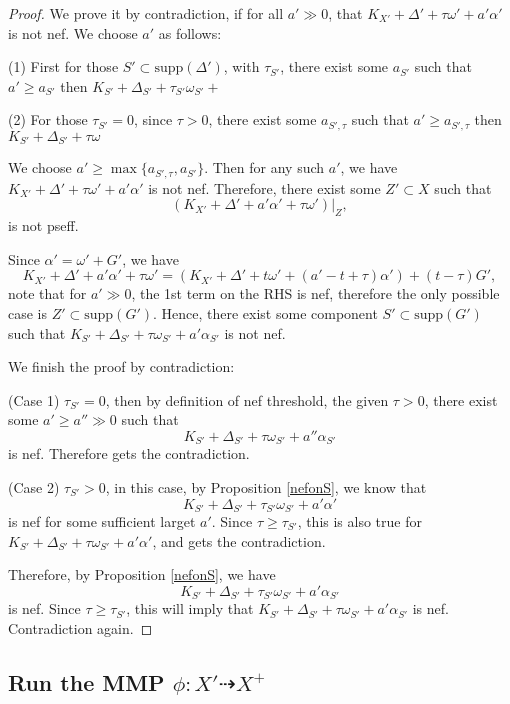 \documentclass[11pt]{article}
\theoremstyle{definition}
\begin{document}
	\begin{proof}
		We prove it by contradiction, if for all $a' \gg 0$, that $K_{X'} + \Delta' + \tau \omega' + a' \alpha '$ is not nef. We choose $a'$ as follows:
		
		(1) First for those $S' \subset \text{supp}(\Delta')$, with $\tau_{S'}$, there exist some $a_{S'}$ such that $a'\ge a_{S'}$ then $K_{S'}+\Delta_{S'} + \tau_{S'} \omega_{S'} + $
		
		(2) For those $\tau_{S'} =0$, since $\tau>0$, there exist some $a_{S', \tau}$ such that $a'\ge a_{S',\tau}$ then $K_{S'}+ \Delta_{S'} + \tau \omega$
		
		We choose $a'  \ge \max \{a_{S',\tau}, a_{S'}\}$. Then for any such $a'$, we have $K_{X'} + \Delta' + \tau \omega ' + a' \alpha'$ is not nef. Therefore, there exist some $Z' \subset X$ such that $$(K_{X'}+ \Delta ' + a' \alpha ' + \tau \omega')|_{Z},$$
		is not pseff. 
		
		Since $\alpha' = \omega ' + G'$, we have $$K_{X'}+ \Delta' + a' \alpha ' + \tau \omega '  = (K_{X'} + \Delta ' + t\omega'+ (a'-t+\tau)\alpha ') + (t- \tau)G',$$
		note that for $a' \gg 0$, the 1st term on the RHS is nef, therefore the only possible case is $Z' \subset \text{supp}(G')$. Hence, there exist some component $S'\subset \text{supp}(G')$ such that $K_{S'} + \Delta_{S'} + \tau \omega_{S'} + a' \alpha_{S'}$ is not nef. 
		
		We finish the proof by contradiction:
		
		(Case 1) $\tau_{S'}=0$, then by definition of nef threshold, the given $\tau>0$, there exist some $a' \ge a'' \gg 0$ such that $$K_{S'}+ \Delta_{S'} + \tau \omega_{S'}  + a'' \alpha_{S'}$$is nef. Therefore gets the contradiction.
		
		(Case 2) $\tau_{S'}>0$, in this case, by Proposition \ref{nefonS}, we know that $$K_{S'}+ \Delta_{S'} + \tau_{S'} \omega _{S'} + a' \alpha '$$is nef for some sufficient larget $a'$. Since $\tau \ge \tau_{S'}$, this is also true for $K_{S'}+ \Delta_{S'} + \tau \omega _{S'} + a' \alpha '$, and gets the contradiction.
		
		Therefore, by Proposition \ref{nefonS}, we have $$K_{S'} + \Delta_{S'} + \tau_{S'} \omega_{S'} + a' \alpha_{S'}$$ is nef. Since $\tau \ge \tau_{S'}$, this will imply that $K_{S'}+ \Delta_{S'} + \tau \omega_{S'} + a' \alpha_{S'}$ is nef. Contradiction again. 
	\end{proof}
	
	\subsection{Run the MMP $\phi:X' \dashrightarrow X^+$}
	
\end{document}
